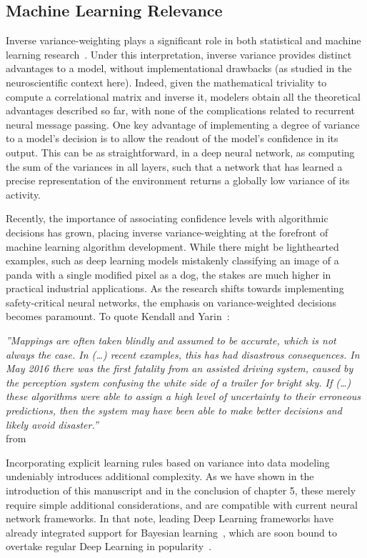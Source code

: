 \subsection{Machine Learning Relevance}
Inverse variance-weighting plays a significant role in both statistical and machine learning research~\cite{murphy2012machine}. Under this interpretation, inverse variance provides distinct advantages to a model, without implementational drawbacks (as studied in the neuroscientific context here). Indeed, given the mathematical triviality to compute a correlational matrix and inverse it, modelers obtain all the theoretical advantages described so far, with none of the complications related to recurrent neural message passing. One key advantage of implementing a degree of variance to a model's decision is to allow the readout of the model's confidence in its output. This can be as straightforward, in a deep neural network, as computing the sum of the variances in all layers, such that a network that has learned a precise representation of the environment returns a globally low variance of its activity.

Recently, the importance of associating confidence levels with algorithmic decisions has grown, placing inverse variance-weighting at the forefront of machine learning algorithm development. While there might be lighthearted examples, such as deep learning models mistakenly classifying an image of a panda with a single modified pixel as a dog, the stakes are much higher in practical industrial applications. As the research shifts towards implementing safety-critical neural networks, the emphasis on variance-weighted decisions becomes paramount. To quote Kendall and Yarin~\cite{kendall2017uncertainties}:  
\begin{flushleft}
    \textit{''Mappings are often taken blindly and assumed to be accurate, which is not always the case. In (\ldots) recent examples, this has had disastrous consequences. In May 2016 there was the first fatality from an assisted driving system, caused by the perception system confusing the white side of a trailer for bright sky. If (\ldots) these algorithms were able to assign a high level of uncertainty to their erroneous predictions, then the system may have been able to make better decisions and likely avoid disaster.''}\\
    from 
\end{flushleft}

Incorporating explicit learning rules based on variance into data modeling undeniably introduces additional complexity. As we have shown in the introduction of this manuscript and in the conclusion of chapter 5, these merely require simple additional considerations, and are compatible with current neural network frameworks. In that note, leading Deep Learning frameworks have already integrated support for Bayesian learning~\cite{paszke2017automatic}, which are soon bound to overtake regular Deep Learning in popularity~\cite{baldwin2022deep}.

